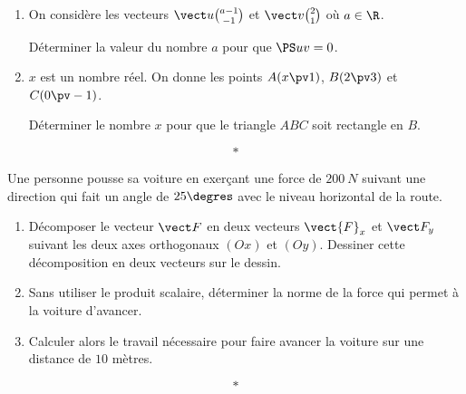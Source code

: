 \documentclass[10pt,openright,twoside,french]{book}
\begin{document}
\small


\exo
\begin{enumerate}
    \item On considère les vecteurs $\vect u \binom{a - 1}{-1}$ et $\vect v\binom{2}{1}$ où $a \in \R$.\par
        Déterminer la valeur du nombre $a$ pour que $\PS u v = 0$.
    \item $x$ est un nombre réel. On donne les points $A(x \pv 1)$, $B(2 \pv 3)$ et $C(0 \pv -1)$.\par
        Déterminer le nombre $x$ pour que le triangle $ABC$ soit rectangle en $B$.
\end{enumerate}\[*\]

\exo Une personne pousse sa voiture en exerçant une force de $200~N$ suivant une direction qui fait un angle de $25\degres$ avec le niveau horizontal de la route.
\begin{center}
\end{center}

\begin{enumerate}
    \item Décomposer le vecteur $\vect F$ en deux vecteurs $\vect{F}_x$ et $\vect F_y$ suivant les deux axes orthogonaux $(Ox)$ et $(Oy)$. Dessiner cette décomposition en deux vecteurs sur le dessin.
    \item Sans utiliser le produit scalaire, déterminer la norme de la force qui permet à la voiture d'avancer.
    \item Calculer alors le travail nécessaire pour faire avancer la voiture sur une distance de $10$ mètres.
\end{enumerate}\[*\]
\end{document}

